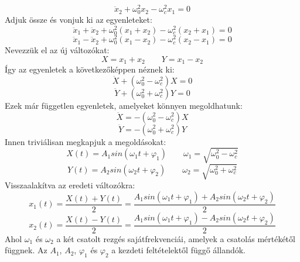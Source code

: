 \documentclass[a4paper,12pt]{article}
\begin{document}
\begin{equation}
    \ddot{x}_2 + \omega_0^2 x_2 - \omega_c^2 x_1 = 0
\end{equation}
Adjuk össze és vonjuk ki az egyenleteket:
\begin{equation}
    \ddot{x}_1 + \ddot{x}_2 + \omega_0^2 (x_1 + x_2) - \omega_c^2 (x_2 + x_1) = 0
\end{equation}
\begin{equation}
    \ddot{x}_1 - \ddot{x}_2 + \omega_0^2 (x_1 - x_2) - \omega_c^2 (x_2 - x_1) = 0
\end{equation}
Nevezzük el az új változókat:
\begin{equation}
    X = x_1 + x_2 \quad \quad Y = x_1 - x_2
\end{equation}
Így az egyenletek a következőképpen néznek ki:
\begin{equation}
    \ddot{X} + (\omega_0^2 - \omega_c^2) X = 0
\end{equation}
\begin{equation}
    \ddot{Y} + (\omega_0^2 + \omega_c^2) Y = 0
\end{equation}
Ezek már független egyenletek, amelyeket könnyen megoldhatunk:
\begin{equation}
    \ddot{X} = - (\omega_0^2 - \omega_c^2) X
\end{equation}
\begin{equation}
    \ddot{Y} = - (\omega_0^2 + \omega_c^2) Y
\end{equation}
Innen triviálisan megkapjuk a megoldásokat:
\begin{equation}
    X(t) = A_1 sin(\omega_1 t + \varphi_1) \quad \quad \omega_1 = \sqrt{\omega_0^2 - \omega_c^2}
\end{equation}
\begin{equation}
    Y(t) = A_2 sin(\omega_2 t + \varphi_2) \quad \quad \omega_2 = \sqrt{\omega_0^2 + \omega_c^2}
\end{equation}
Visszaalakítva az eredeti változókra:
\begin{equation}
    x_1(t) = \frac{X(t) + Y(t)}{2} = \frac{A_1 sin(\omega_1 t + \varphi_1) + A_2 sin(\omega_2 t + \varphi_2)}{2}
\end{equation}
\begin{equation}
    x_2(t) = \frac{X(t) - Y(t)}{2} = \frac{A_1 sin(\omega_1 t + \varphi_1) - A_2 sin(\omega_2 t + \varphi_2)}{2}
\end{equation}
Ahol $\omega_1$ és $\omega_2$ a két csatolt rezgés sajátfrekvenciái, amelyek a csatolás mértékétől függnek. Az $A_1$, $A_2$, $\varphi_1$ és $\varphi_2$ a kezdeti feltételektől függő állandók.
\end{document}
